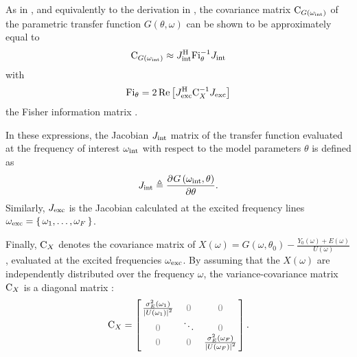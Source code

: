   As in \citep{Pintelon2012, Gallager2008, matrixcookbook}, and equivalently to the derivation in , the covariance matrix $\mathrm{C}_{G\left(\omega_{\mathrm{int}}\right)}$ of the parametric transfer function $G(\theta,\omega)$ can be shown to be approximately equal to
  \begin{align}
    \C_{G\left( \omega_{\interest}\right) } \approx
      \InnerQuadraticForm[\HT]
                         {\jac{\interest}}
                         {\FisherInformation_{\theta}^{-1}}
     \label{eq:excitation:varPeak}
  \end{align}
  with 
  \begin{equation}
    \FisherInformation_{\theta} =
    2
    \real{
          \InnerQuadraticForm[\HT]
                              {\jac{\excited}}
                              {\C_{X}^{-1}}
          }
    \label{eq:excitation:FisherInfo}
  \end{equation}
  the Fisher information matrix \citep{Pintelon2012}.

  In these expressions, the Jacobian $J_{\mathrm{int}}$ matrix of the transfer function evaluated at the frequency of interest $\omega_{\mathrm{int}}$ with respect to the model parameters $\theta$ is defined as
  \begin{equation}
    J_{\mathrm{int}} \triangleq
         \frac{{\partial}^{} G\left( \omega_{\mathrm{int}}, \theta \right) }{\partial \theta}
    \text{.}
  \end{equation}
  Similarly, $J_{\mathrm{exc}}$ is the Jacobian calculated at the excited frequency lines $\omega_{\mathrm{exc}} = \set{\omega_1, \ldots, \omega_F}$.

  Finally, $\mathrm{C}_{X}$ denotes the covariance matrix of $X\left(\omega\right) = G\left(\omega, \theta_0 \right) - \frac{Y_0\left(\omega \right) + E\left( \omega \right)  }{ U\left( \omega \right) } $, evaluated at the excited frequencies $\omega_{\mathrm{exc}}$.
  By assuming that the $X\left( \omega \right) $ are independently distributed over the frequency $\omega$, the variance-covariance matrix $\mathrm{C}_{X}$ is a diagonal matrix \citep{Pintelon2012}:
  \begin{equation}
    \C_{X} =
               \left[ \left.
               \begin{matrix}
                 \frac{\sigma^2_E\left(\omega_1 \right) }
                      {\abs{ U\left(\omega_1 \right)}^2 } & \deemph{0} & \deemph{0}\\
                 \deemph{0} & \ddots & \deemph{0} \\
                 \deemph{0} & \deemph{0} & \frac{\sigma^2_E\left(\omega_F \right) }
                              {\abs{U\left(\omega_F \right)}^2 }
               \end{matrix}
               \right.^{\vphantom{x}}\right]
    \text{.}
  \end{equation}

